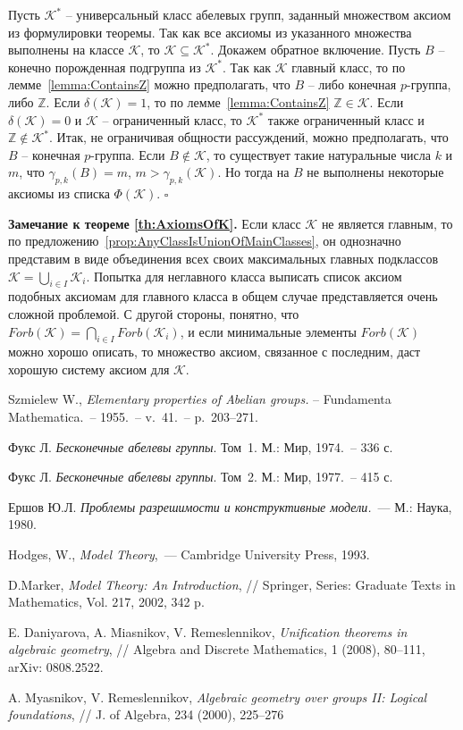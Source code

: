 \documentclass[a4paper,11pt,twoside]{article}
\def\proof{{\noindent{\bf Доказательство.}} }
\def\K{{\mathcal{K}}}
\def\Z{{\mathbb{Z}}}
\begin{document}
\proof Пусть $\K^*$ -- универсальный класс абелевых групп, заданный множеством аксиом из формулировки теоремы. Так как все аксиомы из указанного множества выполнены на классе $\K$, то $\K \subseteq \K^*$. Докажем обратное включение. Пусть $B$ -- конечно порожденная подгруппа из $\K^*$. Так как $\K$ главный класс, то по лемме~\ref{lemma:ContainsZ} можно предполагать, что $B$ -- либо конечная $p$-группа, либо $\Z$. Если $\delta(\K) = 1$, то по лемме~\ref{lemma:ContainsZ} $\Z \in \K$. Если $\delta(\K) = 0$ и $\K$ -- ограниченный класс, то $\K^*$ также ограниченный класс и $\Z \notin \K^*$. Итак, не ограничивая общности рассуждений, можно предполагать, что $B$ -- конечная $p$-группа. Если $B \notin \K$, то существует такие натуральные числа $k$ и $m$, что $\gamma_{p,k}(B) = m$, $m > \gamma_{p,k}(\K)$. Но тогда на $B$ не выполнены некоторые аксиомы из списка $\Phi(\K)$. $\square$

\noindent\textbf{Замечание к теореме \ref{th:AxiomsOfK}.} Если класс $\K$ не является главным, то по предложению~\ref{prop:AnyClassIsUnionOfMainClasses}, он однозначно представим в виде объединения всех своих максимальных главных подклассов $\K = \bigcup\limits_{i \in I} \K_i$. Попытка для неглавного класса выписать список аксиом подобных аксиомам для главного класса в общем случае представляется очень сложной проблемой. С другой стороны, понятно, что $Forb(\K) = \bigcap\limits_{i \in I} Forb(\K_i)$, и если минимальные элементы $Forb(\K)$ можно хорошо описать, то множество аксиом, связанное с последним, даст хорошую систему аксиом для $\K$.

\begin{thebibliography}{}

 Szmielew W., \textit{Elementary properties of Abelian groups.} -- Fundamenta Mathematica.~-- 1955.~-- v.~41.~-- p.~203--271.

 Фукс Л. \textit{Бесконечные абелевы группы}. Том~1. М.: Мир, 1974.~-- 336 с.

 Фукс Л. \textit{Бесконечные абелевы группы}. Том~2. М.: Мир, 1977.~-- 415 с.

 Ершов Ю.Л. \textit{Проблемы разрешимости и конструктивные модели.}~--- М.: Наука, 1980.

 Hodges, W., \textit{Model Theory},~--- Cambridge University Press, 1993. 

 D.Marker, \textit{Model Theory: An Introduction}, // Springer, Series: Graduate Texts in Mathematics, Vol. 217, 2002, 342 p.

 E. Daniyarova, A. Miasnikov, V. Remeslennikov, \textit{Unification theorems in algebraic geometry}, // Algebra and Discrete Mathematics, 1 (2008), 80--111, arXiv: 0808.2522.

 A. Myasnikov, V. Remeslennikov, \textit{Algebraic geometry over groups II: Logical foundations}, // J. of Algebra, 234 (2000), 225--276

\end{thebibliography}
\end{document}
